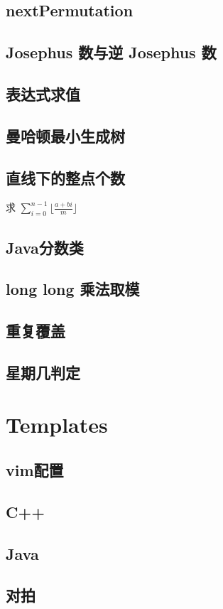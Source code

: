\documentclass[landscape, twocolumn, 8pt, a4paper, twoside]{extarticle}
\begin{document}
  \subsection{nextPermutation}
    

  \subsection{Josephus 数与逆 Josephus 数}
    
  
  \subsection{表达式求值}
    

  \subsection{曼哈顿最小生成树}
    

  \subsection{直线下的整点个数}
    求 $\sum_{i=0}^{n-1} \lfloor\frac{a+bi}{m}\rfloor$
    

  \subsection{Java分数类}
    

  \subsection{long long 乘法取模}
    

  \subsection{重复覆盖}
    
  
  \subsection{星期几判定}
    

\section{Templates}
  \subsection{vim配置}
    
  \subsection{C++}
    
  \subsection{Java}
    
  \subsection{对拍}
    
\end{document}
